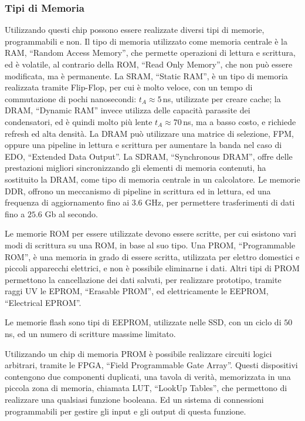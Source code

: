 \documentclass{article}
\numberwithin{equation}{subsection}
\begin{document}
\subsubsection{Tipi di Memoria}

Utilizzando questi chip possono essere realizzate diversi tipi di memorie, programmabili e non. Il tipo di memoria utilizzato come memoria centrale è la RAM, ``Random Access Memory'', che permette operazioni di 
lettura e scrittura, ed è volatile, al contrario della ROM, ``Read Only Memory'', che non può essere modificata, ma è permanente.  
La SRAM, ``Static RAM'', è un tipo di memoria realizzata tramite Flip-Flop, per cui è molto veloce, con un tempo di commutazione di pochi nanosecondi: $t_A\approx5\,$ns, utilizzate 
per creare cache; la DRAM, ``Dynamic RAM'' invece utilizza delle capacità 
parassite dei condensatori, ed è quindi molto più lente $t_A\approx70\,$ns, ma a basso costo, e richiede refresh ed alta densità. La DRAM può utilizzare una matrice di selezione, FPM, oppure una pipeline in 
lettura e scrittura per aumentare la banda nel caso di EDO, ``Extended Data Output''. 
La SDRAM, ``Synchronous DRAM'', offre delle prestazioni migliori sincronizzando gli elementi di memoria contenuti, ha sostituito la DRAM, come tipo di memoria centrale in un calcolatore. 
Le memorie DDR, offrono un meccanismo di pipeline in scrittura ed in lettura, ed una frequenza di aggiornamento fino ai $3.6$ GHz, per permettere trasferimenti di dati fino a $25.6$ Gb al secondo. 

Le memorie ROM per essere utilizzate devono essere scritte, per cui esistono vari modi di scrittura su una ROM, in base al suo tipo. Una PROM, ``Programmable ROM'', è una memoria in grado di essere scritta, utilizzata 
per elettro domestici e piccoli apparecchi elettrici, e non è possibile eliminarne i dati. Altri tipi di PROM permettono la cancellazione dei dati salvati, per realizzare prototipo, tramite raggi UV le EPROM, ``Erasable 
PROM'', ed elettricamente le EEPROM, ``Electrical EPROM''. 

Le memorie flash sono tipi di EEPROM, utilizzate nelle SSD, con un ciclo di $50\,$ns, ed un numero di scritture massime limitato. 


Utilizzando un chip di memoria PROM è possibile realizzare circuiti logici arbitrari, tramite le FPGA, ``Field Programmable Gate Array''. Questi dispositivi contengono due componenti duplicati, una tavola 
di verità, memorizzata in una piccola zona di memoria, chiamata LUT, ``LookUp Tables'', che permettono di realizzare una qualsiasi funzione booleana. Ed un sistema di connessioni programmabili per gestire gli 
input e gli output di questa funzione. 
\end{document}
